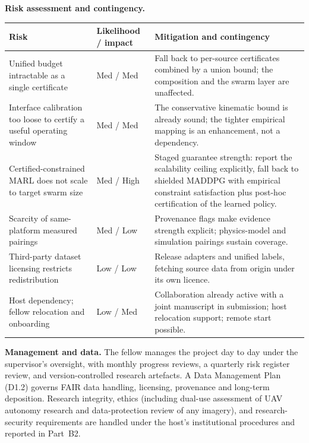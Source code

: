 \documentclass[11pt,a4paper]{article}
\begin{document}
\textbf{Risk assessment and contingency.}
\begin{center}
\begin{tabularx}{\linewidth}{@{}p{4.9cm}p{1.5cm}Y@{}}
\toprule
{}
\textbf{Risk} & \textbf{Likelihood / impact} & \textbf{Mitigation and contingency} \\
\midrule
Unified budget intractable as a single certificate & Med / Med & Fall back to per-source certificates combined by a union bound; the composition and the swarm layer are unaffected. \\
Interface calibration too loose to certify a useful operating window & Med / Med & The conservative kinematic bound is already sound; the tighter empirical mapping is an enhancement, not a dependency. \\
Certified-constrained MARL does not scale to target swarm size & Med / High & Staged guarantee strength: report the scalability ceiling explicitly, fall back to shielded MADDPG with empirical constraint satisfaction plus post-hoc certification of the learned policy. \\
Scarcity of same-platform measured pairings & Med / Low & Provenance flags make evidence strength explicit; physics-model and simulation pairings sustain coverage. \\
Third-party dataset licensing restricts redistribution & Low / Low & Release adapters and unified labels, fetching source data from origin under its own licence. \\
Host dependency; fellow relocation and onboarding & Low / Med & Collaboration already active with a joint manuscript in submission; host relocation support; remote start possible. \\
\bottomrule
\end{tabularx}
\end{center}

\textbf{Management and data.} The fellow manages the project day to day under the supervisor's oversight, with monthly progress reviews, a quarterly risk register review, and version-controlled research artefacts. A Data Management Plan (D1.2) governs FAIR data handling, licensing, provenance and long-term deposition. Research integrity, ethics (including dual-use assessment of UAV autonomy research and data-protection review of any imagery), and research-security requirements are handled under the host's institutional procedures and reported in Part~B2.
\end{document}
